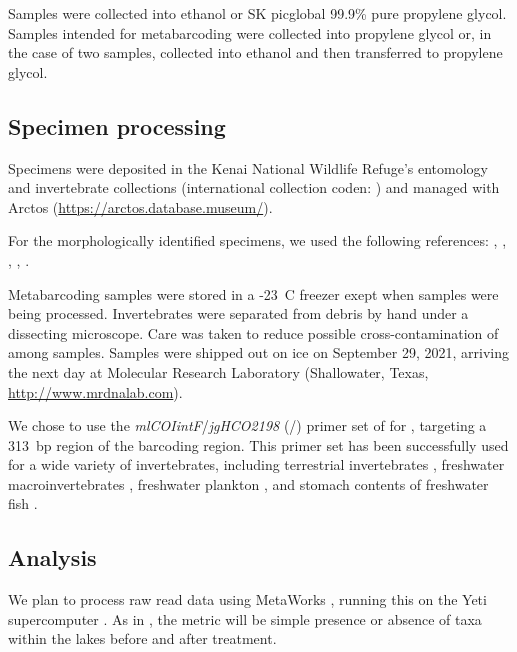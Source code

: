 \begin{multicols}{2}


Samples were collected into ethanol or SK picglobal 99.9\% pure propylene glycol. Samples intended for metabarcoding were collected into propylene glycol or, in the case of two samples, collected into ethanol and then transferred to propylene glycol.

\subsection{Specimen processing}

Specimens were deposited in the Kenai National Wildlife Refuge's entomology and invertebrate collections (international collection coden: ) and managed with Arctos (\url{https://arctos.database.museum/}).



For the morphologically identified specimens, we used the following references: \cite{Durfee2005}, \cite{Hatch1953}, \citet{Kenner2009}, \citet{Roughley2000}, \citet{Wallis1933}.

Metabarcoding samples were stored in a -23~\textdegree{}C freezer exept when samples were being processed. Invertebrates were separated from debris by hand under a dissecting microscope. Care was taken to reduce possible cross-contamination of  among samples. Samples were shipped out on ice on September 29, 2021, arriving the next day at Molecular Research Laboratory (Shallowater, Texas, \url{http://www.mrdnalab.com}).

We chose to use the \textit{mlCOIintF}/\textit{jgHCO2198} (\-/\-) primer set of \citet{Lerayetal2013} for , targeting a 313~bp region of the   barcoding region. This primer set has been successfully used for a wide variety of invertebrates, including terrestrial invertebrates \citep{Bowseretal2020}, freshwater macroinvertebrates \citep{Hajibabaeietal2019}, freshwater plankton \citep{Yangetal2017}, and stomach contents of freshwater fish \citep{BowserBowser2020}.

\subsection{Analysis}

We plan to process raw read data using MetaWorks \citep{PorterHajibabaei2020}, running this on the Yeti supercomputer \citep{USGSARC2021}. As in \citet{Massengill2014, Massengill2017}, the metric will be simple presence or absence of taxa within the lakes before and after treatment.



\end{multicols}
